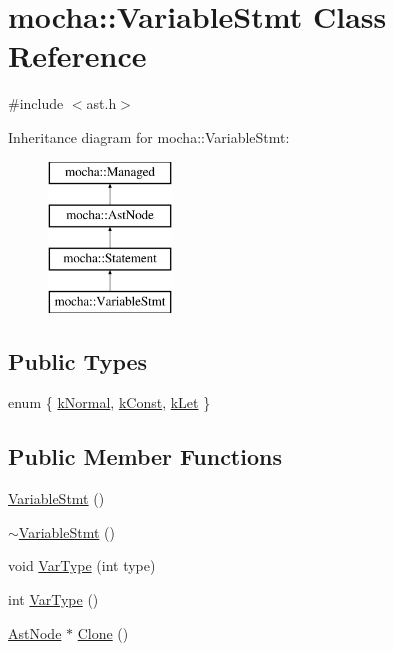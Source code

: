 \hypertarget{classmocha_1_1_variable_stmt}{
\section{mocha::VariableStmt Class Reference}
\label{classmocha_1_1_variable_stmt}
}


{\ttfamily \#include $<$ast.h$>$}

Inheritance diagram for mocha::VariableStmt:\begin{figure}[H]
\begin{center}
\leavevmode
\includegraphics[height=4.000000cm]{classmocha_1_1_variable_stmt}
\end{center}
\end{figure}
\subsection*{Public Types}
\begin{DoxyCompactItemize}
\item 
enum \{ \hyperlink{classmocha_1_1_variable_stmt_a76dcc2b0499516f3751f00e2cc31b801a2aa52cda83b3100be9e1535fb6dd8fdb}{kNormal}, 
\hyperlink{classmocha_1_1_variable_stmt_a76dcc2b0499516f3751f00e2cc31b801a9a049e44362d97155f204c6491bfe27a}{kConst}, 
\hyperlink{classmocha_1_1_variable_stmt_a76dcc2b0499516f3751f00e2cc31b801ab4a1164fb3fb8c14c0e30b3d2c7d6a21}{kLet}
 \}
\end{DoxyCompactItemize}
\subsection*{Public Member Functions}
\begin{DoxyCompactItemize}
\item 
\hyperlink{classmocha_1_1_variable_stmt_aa916f1a4972679b21f709579edebddd2}{VariableStmt} ()
\item 
\hyperlink{classmocha_1_1_variable_stmt_ace989ce2b38274b312ac48749fd4d47a}{$\sim$VariableStmt} ()
\item 
void \hyperlink{classmocha_1_1_variable_stmt_a43d7ca0e1595a59a40939a6bd6f22376}{VarType} (int type)
\item 
int \hyperlink{classmocha_1_1_variable_stmt_afd153afefac0a1b59f60d2b0a6729739}{VarType} ()
\item 
\hyperlink{classmocha_1_1_ast_node}{AstNode} $\ast$ \hyperlink{classmocha_1_1_variable_stmt_af912363301f38a33902ab2d98978c4f2}{Clone} ()
\end{DoxyCompactItemize}
